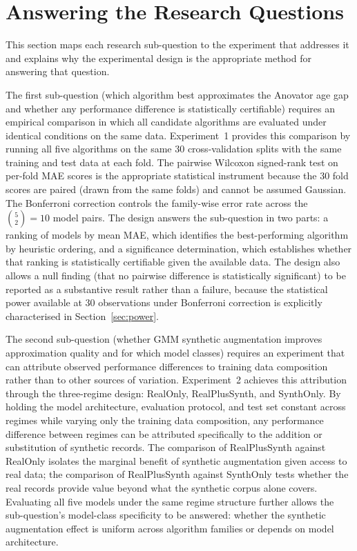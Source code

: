 \documentclass[11pt,a4paper]{report}
\begin{document}
\section{Answering the Research Questions}

This section maps each research sub-question to the experiment that addresses it and explains why
the experimental design is the appropriate method for answering that question.

The first sub-question (which algorithm best approximates the Anovator age gap and whether any
performance difference is statistically certifiable) requires an empirical comparison in which
all candidate algorithms are evaluated under identical conditions on the same data. Experiment~1
provides this comparison by running all five algorithms on the same 30 cross-validation splits
with the same training and test data at each fold. The pairwise Wilcoxon signed-rank test on
per-fold MAE scores is the appropriate statistical instrument because the 30 fold scores are
paired (drawn from the same folds) and cannot be assumed Gaussian. The Bonferroni correction
controls the family-wise error rate across the $\binom{5}{2} = 10$ model pairs. The design answers the
sub-question in two parts: a ranking of models by mean MAE, which identifies the best-performing
algorithm by heuristic ordering, and a significance determination, which establishes whether that
ranking is statistically certifiable given the available data. The design also allows a
null finding (that no pairwise difference is statistically significant) to be reported as a
substantive result rather than a failure, because the statistical power available at 30
observations under Bonferroni correction is explicitly characterised in
Section~\ref{sec:power}.

The second sub-question (whether GMM synthetic augmentation improves approximation quality and
for which model classes) requires an experiment that can attribute observed performance
differences to training data composition rather than to other sources of variation.
Experiment~2 achieves this attribution through the three-regime design: RealOnly, RealPlusSynth,
and SynthOnly. By holding the model architecture, evaluation protocol, and test set constant
across regimes while varying only the training data composition, any performance difference between
regimes can be attributed specifically to the addition or substitution of synthetic records. The
comparison of RealPlusSynth against RealOnly isolates the marginal benefit of synthetic
augmentation given access to real data; the comparison of RealPlusSynth against SynthOnly tests
whether the real records provide value beyond what the synthetic corpus alone covers. Evaluating
all five models under the same regime structure further allows the sub-question's model-class
specificity to be answered: whether the synthetic augmentation effect is uniform across algorithm
families or depends on model architecture.
\end{document}
